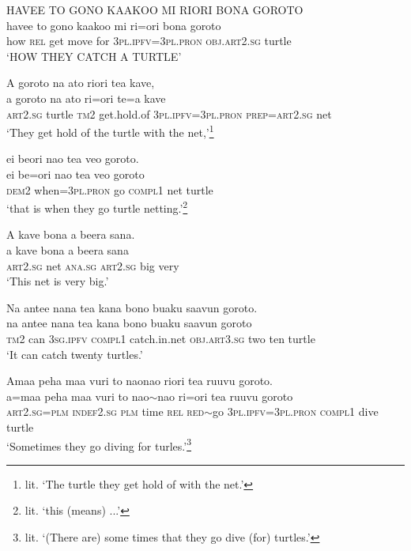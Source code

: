 \ea\label{ex:text19-22}
HAVEE TO GONO KAAKOO MI RIORI BONA GOROTO\\
\gll havee	to	gono	kaakoo	mi	ri=ori	bona	goroto\\
     how	\textsc{rel}	get	move	for	3\textsc{pl}.\textsc{ipfv}=3\textsc{pl}.\textsc{pron}	\textsc{obj}.\textsc{art}2.\textsc{sg}	turtle\\
\glt `HOW THEY CATCH A TURTLE'
\z

\newpage
\ea\label{ex:text19-23}
A goroto na ato riori tea kave,\\
\gll a	goroto	na	ato	ri=ori	te=a	kave\\
     \textsc{art}2.\textsc{sg}	turtle	\textsc{tm}2	get.hold.of	3\textsc{pl}.\textsc{ipfv}=3\textsc{pl}.\textsc{pron}	\textsc{prep}=\textsc{art}2.\textsc{sg}	net\\
\glt `They get hold of the turtle with the net,'\footnote{lit. `The turtle they get hold of with the net.'}
\z


\ea\label{ex:text19-24}
ei beori nao tea veo goroto.\\
\gll ei	be=ori	nao	tea	veo	goroto\\
     \textsc{dem}2	when=3\textsc{pl}.\textsc{pron}	go	\textsc{compl}1	net	turtle\\
\glt `that is when they go turtle netting.'\footnote{lit. `this (means) ...'}
\z

\ea\label{ex:text19-25}
A kave bona a beera sana.\\
\gll a	kave	bona	a	beera	sana\\
     \textsc{art}2.\textsc{sg}	net	\textsc{ana}.\textsc{sg}	\textsc{art}2.\textsc{sg}	big	very\\
\glt `This net is very big.'
\z

\ea\label{ex:text19-26}
Na antee nana tea kana bono buaku saavun goroto.\\
\gll na	antee	nana	tea	kana	bono	buaku	saavun	goroto\\
     \textsc{tm}2	can	3\textsc{sg}.\textsc{ipfv}	\textsc{compl}1	catch.in.net	\textsc{obj}.\textsc{art}3.\textsc{sg}	two	ten	turtle\\
\glt `It can catch twenty turtles.'
\z

\ea\label{ex:text19-27}
Amaa peha maa vuri to naonao riori tea ruuvu goroto.\\
\gll a=maa	peha	maa	vuri	to	nao{$\sim$}nao	ri=ori	tea	ruuvu	goroto\\
     \textsc{art}2.\textsc{sg}=\textsc{plm}	\textsc{indef}2.\textsc{sg}	\textsc{plm}	time	\textsc{rel}	\textsc{red}{$\sim$}go	3\textsc{pl}.\textsc{ipfv}=3\textsc{pl}.\textsc{pron}	\textsc{compl}1	dive	turtle\\
\glt `Sometimes they go diving for turles.'\footnote{lit. `(There are) some times that they go dive (for) turtles.'}
\z

